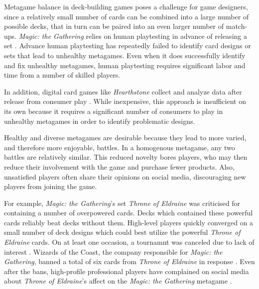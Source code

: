 Metagame balance in deck-building games poses a challenge for game
designers, since a relatively small number of cards can be combined
into a large number of possible decks, that in turn can be paired
into an even larger number of match-ups. \textit{Magic: the Gathering}
relies on human playtesting in advance of releasing a set
\cite{designing-hod-ffl}. Advance human playtesting has repeatedly
failed to identify card designs or sets that lead to unhealthy
metagames. Even when it does successfully identify and fix unhealthy
metagames, human playtesting requires significant labor and time from
a number of skilled players.

In addition, digital card games like \textit{Hearthstone} collect and
analyze data after release from consumer play
\cite{blizzard-gamebalancetalk-keg2019}. While inexpensive, this
approach is insufficient on its own because it requires a significant
number of consumers to play in unhealthy metagames in order to
identify problematic designs.


Healthy and diverse metagames are desirable because they lead to more
varied, and therefore more enjoyable, battles. In a homogenous
metagame, any two battles are relatively similar. This reduced novelty
bores players, who may then reduce their involvement with the game and
purchase fewer products. Also, unsatisfied players often share their
opinions on social media, discouraging new players from joining the
game.


For example, \textit{Magic: the Gathering}'s set \textit{Throne of
  Eldraine} was criticised for containing a number of overpowered
cards. Decks which contained these powerful cards reliably beat decks
without them. High-level players quickly converged on a small number
of deck designs which could best utilize the powerful \textit{Throne
  of Eldraine} cards. On at least one occasion, a tournamnt was
canceled due to lack of interest \cite{oko-meta-drama}. Wizards of the
Coast, the company responsible for \textit{Magic: the Gathering},
banned a total of six cards from \textit{Throne of Eldraine} in
response \cite{mtg-banlist, mtg-bnr-nov-2019, mtg-bnr-jun-2020,
  mtg-bnr-aug-2020}. Even after the bans, high-profile professional
players have complained on social media about \textit{Throne of
  Eldraine}'s affect on the \textit{Magic: the Gathering} metagame
\cite{lsv-eldraine-complaints}.

